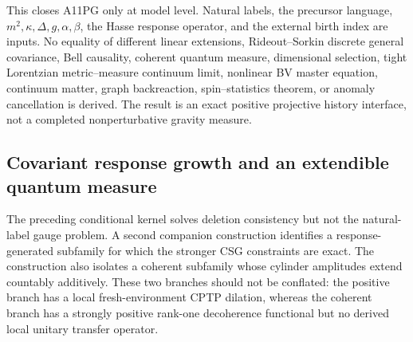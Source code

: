 This closes A11PG only at model level.  Natural labels, the precursor
language, \(m^2,\kappa,\Delta,g,\alpha,\beta\), the Hasse response operator,
and the external birth index are inputs.  No equality of different linear
extensions, Rideout--Sorkin discrete general covariance, Bell causality,
coherent quantum measure, dimensional selection, tight Lorentzian
metric--measure continuum limit, nonlinear BV master equation, continuum
matter, graph backreaction, spin--statistics theorem, or anomaly
cancellation is derived.  The result is an exact positive projective
history interface, not a completed nonperturbative gravity measure.

\subsection{Covariant response growth and an extendible quantum measure}
\label{sec:covariant-response-growth}

The preceding conditional kernel solves deletion consistency but not the
natural-label gauge problem.  A second companion construction
\cite{XuCovariantQuantumResponseGrowth2026} identifies a response-generated
subfamily for which the stronger CSG constraints are exact.  The
construction also isolates a coherent subfamily whose cylinder amplitudes
extend countably additively.  These two branches should not be conflated:
the positive branch has a local fresh-environment CPTP dilation, whereas the
coherent branch has a strongly positive rank-one decoherence functional but
no derived local unitary transfer operator.

